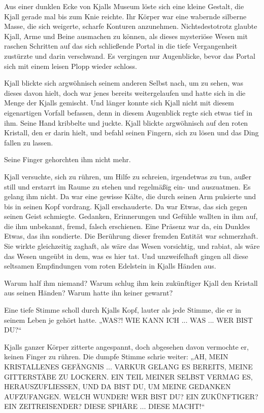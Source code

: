 \documentclass[10pt, a4paper, oneside]{book}
\begin{document}
Aus einer dunklen Ecke von Kjalls Museum löste sich eine kleine Gestalt, die Kjall gerade mal bis zum Knie reichte. Ihr Körper war eine wabernde silberne Masse, die sich weigerte, scharfe Konturen anzunehmen. Nichtsdestotrotz glaubte Kjall, Arme und Beine ausmachen zu können, als dieses mysteriöse Wesen mit raschen Schritten auf das sich schließende Portal in die tiefe Vergangenheit zustürzte und darin verschwand. Es vergingen nur Augenblicke, bevor das Portal sich mit einem leisen Plopp wieder schloss.

Kjall blickte sich argwöhnisch seinem anderen Selbst nach, um zu sehen, was dieses davon hielt, doch war jenes bereits weitergelaufen und hatte sich in die Menge der Kjalls gemischt. Und länger konnte sich Kjall nicht mit diesem eigenartigen Vorfall befassen, denn in diesem Augenblick regte sich etwas tief in ihm. Seine Hand kribbelte und juckte. Kjall blickte argwöhnisch auf den roten Kristall, den er darin hielt, und befahl seinen Fingern, sich zu lösen und das Ding fallen zu lassen.

Seine Finger gehorchten ihm nicht mehr.

Kjall versuchte, sich zu rühren, um Hilfe zu schreien, irgendetwas zu tun, außer still und erstarrt im Raume zu stehen und regelmäßig ein- und auszuatmen. Es gelang ihm nicht. Da war eine gewisse Kälte, die durch seinen Arm pulsierte und bis in seinen Kopf vordrang. Kjall erschauderte. Da war Etwas, das sich gegen seinen Geist schmiegte. Gedanken, Erinnerungen und Gefühle wallten in ihm auf, die ihm unbekannt, fremd, falsch erschienen. Eine Präsenz war da, ein Dunkles Etwas, das ihn sondierte. Die Berührung dieser fremden Entität war schmerzhaft. Sie wirkte gleichzeitig zaghaft, als wäre das Wesen vorsichtig, und rabiat, als wäre das Wesen ungeübt in dem, was es hier tat. Und unzweifelhaft gingen all diese seltsamen Empfindungen vom roten Edelstein in Kjalls Händen aus.

Warum half ihm niemand? Warum schlug ihm kein zukünftiger Kjall den Kristall aus seinen Händen? Warum hatte ihn keiner gewarnt?

Eine tiefe Stimme scholl durch Kjalls Kopf, lauter als jede Stimme, die er in seinem Leben je gehört hatte. „WAS?! WIE KANN ICH ... WAS ... WER BIST DU?“

Kjalls ganzer Körper zitterte angespannt, doch abgesehen davon vermochte er, keinen Finger zu rühren. Die dumpfe Stimme schrie weiter: „AH, MEIN KRISTALLENES GEFÄNGNIS ... VARKUR GELANG ES BEREITS, MEINE GITTERSTÄBE ZU LOCKERN. EIN TEIL MEINER SELBST VERMAG ES, HERAUSZUFLIESSEN, UND DA BIST DU, UM MEINE GEDANKEN AUFZUFANGEN. WELCH WUNDER! WER BIST DU? EIN ZUKÜNFTIGER? EIN ZEITREISENDER? DIESE SPHÄRE ... DIESE MACHT!“
\end{document}
